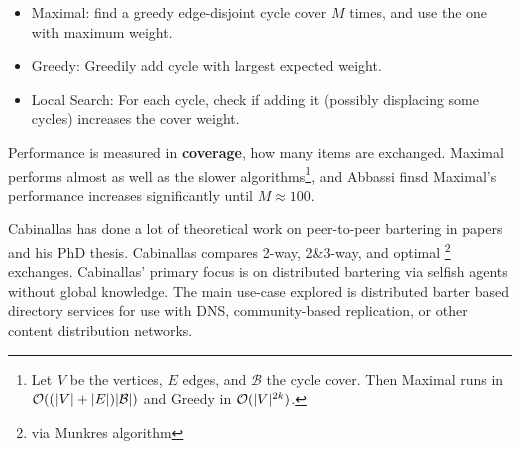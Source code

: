 \documentclass[main.tex]{subfiles}
\begin{document}
\begin{itemize}
  \item Maximal: find a greedy edge-disjoint cycle cover $M$ times, and use the one with maximum weight.
  \item Greedy: Greedily add cycle with largest expected weight.
  \item Local Search: For each cycle, check if adding it (possibly displacing some cycles) increases the cover weight.
\end{itemize}

Performance is measured in \textbf{coverage}, how many items are exchanged. Maximal performs almost as well as the slower algorithms\footnote{Let $V$ be the vertices, $E$ edges, and $\mathcal{B}$ the cycle cover. Then Maximal runs in $\mathcal{O}((|V| + |E|)|\mathcal{B}|)$ and Greedy  in $\mathcal{O}(|V|^{2k})$.}, and Abbassi finsd Maximal's performance increases significantly until $M \approx 100$.

Cabinallas \cite{Cab0} \cite{Cab1} has done a lot of theoretical work on peer-to-peer bartering in papers and his PhD thesis. Cabinallas compares 2-way, 2\&3-way, and optimal \footnote{via Munkres algorithm} exchanges. Cabinallas' primary focus is on distributed bartering via selfish agents without global knowledge. The main use-case explored is distributed barter based directory services for use with DNS, community-based replication, or other content distribution networks.
\end{document}
